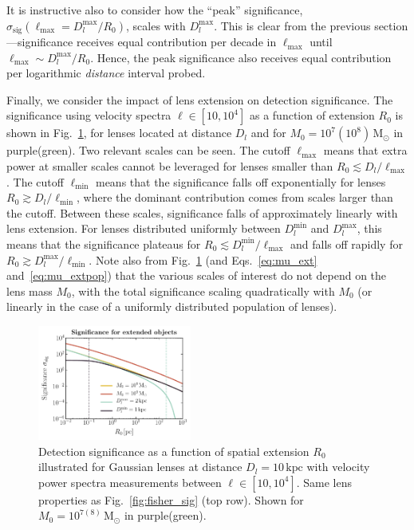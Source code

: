 \documentclass[prd,aps,10pt,nofootinbib,twocolumn,superscriptaddress,preprintnumbers,balancelastpage,longbibliography]{revtex4-1}
\begin{document}
It is instructive also to consider how the ``peak'' significance, $\sigma_\mathrm{sig}(\ell_\mathrm{max} = D_l^\mathrm{max}/R_0)$, scales with $D_l^\mathrm{max}$. This is clear from the previous section---significance receives equal contribution per decade in $\ell_\mathrm{max}$ until $\ell_\mathrm{max} \sim D_l^\mathrm{max}/R_0$. Hence, the peak significance also receives equal contribution per logarithmic \emph{distance} interval probed.

Finally, we consider the impact of lens extension on detection significance. The significance using velocity spectra $\ell \in [10, 10^4]$ as a function of extension $R_0$ is shown in Fig.~\ref{fig:sig_R0}, for lenses located at distance $D_l$ and for $M_0 = 10^{7}(10^{8})\,\mathrm{M}_\odot$ in purple(green). Two relevant scales can be seen. The cutoff $\ell_\mathrm{max}$ means that extra power at smaller scales cannot be leveraged for lenses smaller than $R_0 \lesssim D_l/\ell_\mathrm{max}$. The cutoff $\ell_\mathrm{min}$ means that the significance falls off exponentially for lenses $R_0 \gtrsim D_l/\ell_\mathrm{min}$, where the dominant contribution comes from scales larger than the cutoff. Between these scales, significance falls of approximately linearly with lens extension. For lenses distributed uniformly between $D_l^\mathrm{min}$ and $D_l^\mathrm{max}$, this means that the significance plateaus for $R_0 \lesssim D_l^\mathrm{min}/\ell_\mathrm{max}$ and falls off rapidly for $R_0 \gtrsim D_l^\mathrm{max}/\ell_\mathrm{min}$. Note also from Fig.~\ref{fig:sig_R0} (and Eqs.~\ref{eq:mu_ext} and~\ref{eq:mu_extpop}) that the various scales of interest do not depend on the lens mass $M_0$, with the total significance scaling quadratically with $M_0$ (or linearly in the case of a uniformly distributed population of lenses).

\begin{figure}[htbp]
  \centering
  \includegraphics[width=0.45\textwidth]{plots/sig_R0}
  \caption{Detection significance as a function of spatial extension $R_0$ illustrated for Gaussian lenses at distance $D_l=10\,\mathrm{kpc}$ with velocity power spectra measurements between $\ell \in [10, 10^4]$. Same lens properties as Fig.~\ref{fig:fisher_sig} (top row). Shown for $M_0 = 10^{7(8)}\,\mathrm{M}_\odot$ in purple(green).} 
  \label{fig:sig_R0}
\end{figure}{}
\end{document}
